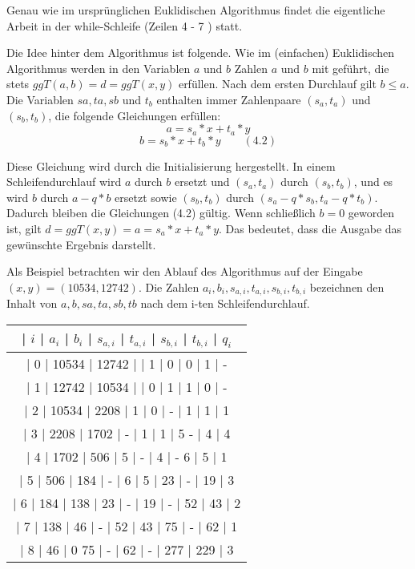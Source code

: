 \documentclass[a4paper]{article}
\begin{document}
\begin{multicols}{3}
    Genau wie im ursprünglichen Euklidischen Algorithmus findet die eigentliche Arbeit in der while-Schleife (Zeilen 4 - 7 ) statt.

    Die Idee hinter dem Algorithmus ist folgende. Wie im (einfachen) Euklidischen Algorithmus werden in den Variablen $a$ und $b$ Zahlen $a$ und $b$ mit geführt, die stets $ggT(a,b) =d= ggT(x,y)$ erfüllen. Nach dem ersten Durchlauf gilt $b\leq a$. Die Variablen $sa,ta,sb$ und $t_b$ enthalten immer Zahlenpaare $(s_a,t_a)$ und $(s_b,t_b)$, die folgende Gleichungen erfüllen:
    $$a=s_a*x+t_a*y$$
    $$b=s_b*x+t_b*y \quad\quad(4.2)$$

    Diese Gleichung wird durch die Initialisierung hergestellt. In einem Schleifendurchlauf wird $a$ durch $b$ ersetzt und $(s_a,t_a)$ durch $(s_b,t_b)$, und es wird $b$ durch $a-q*b$ ersetzt sowie $(s_b,t_b)$ durch $(s_a-q*s_b, t_a-q*t_b)$. Dadurch bleiben die Gleichungen (4.2) gültig. Wenn schließlich $b=0$ geworden ist, gilt $d=ggT(x,y) =a=s_a*x+t_a*y$. Das bedeutet, dass die Ausgabe das gewünschte Ergebnis darstellt.

    Als Beispiel betrachten wir den Ablauf des Algorithmus auf der Eingabe $(x,y) =(10534,12742)$. Die Zahlen $a_i,b_i,s_{a,i},t_{a,i},s_{b,i},t_{b,i}$ bezeichnen den Inhalt von $a,b,sa,ta,sb,tb$ nach dem i-ten Schleifendurchlauf.
    \begin{tabular}{c}
        | $i$ | $a_i$ | $b_i$ | $s_{a,i}$ | $t_{a,i}$ | $s_{b,i}$ | $t_{b,i}$ | $q_i$ \\\hline
        | 0  | 10534 | 12742 |      | 1     | 0     | 0     | 1   | -                 \\
        | 1  | 12742 | 10534 |      | 0     | 1     | 1     | 0   | -                 \\
        | 2  | 10534 | 2208 | 1     | 0     | -     | 1     | 1   | 1                 \\
        | 3  | 2208 | 1702 | -     | 1     | 1     | 5 -    | 4   | 4                 \\
        | 4  | 1702 | 506  | 5     | -     | 4     | - 6    | 5   | 1                 \\
        | 5  | 506  | 184  | -     | 6     | 5     | 23    | -   | 19 | 3             \\
        | 6  | 184  | 138  | 23    | -     | 19    | -     | 52  | 43 | 2             \\
        | 7  | 138  | 46  | -     | 52    | 43    | 75    | -   | 62 | 1              \\
        | 8  | 46  | 0 75 | -     | 62    | -     | 277    | 229  | 3
    \end{tabular}


\end{multicols}
\end{document}
